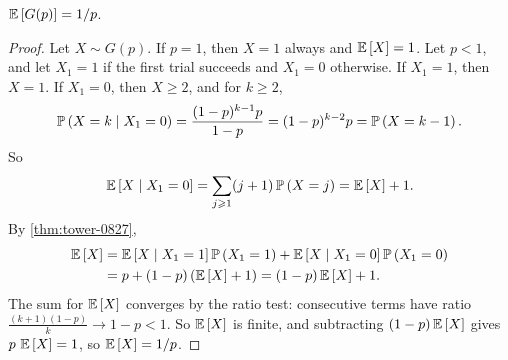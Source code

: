 \begin{theorem}\label{thm:geometric-0827}
    $\expectation{G(p)} = \sfrac{1}{p}$.
\end{theorem}

\begin{proof}
    Let $X \sim G(p)$. If $p = 1$, then $X = 1$ always and $\expectation{X} = 1$. Let $p < 1$, and
    let $X_1 = 1$ if the first trial succeeds and $X_1 = 0$ otherwise. If $X_1 = 1$, then $X = 1$.
    If $X_1 = 0$, then $X \geq 2$, and for $k \geq 2$,
    \[\prob{X = k \given X_1 = 0} = \frac{(1-p)^{k-1} p}{1 - p} = (1-p)^{k-2} p = \prob{X = k - 1}.\]
    So
    \[\expectation{X \given X_1 = 0} = \sum_{j \geq 1} (j + 1) \prob{X = j} = \expectation{X} + 1.\]
    By \cref{thm:tower-0827},
    \begin{align*}
        \expectation{X}
         & = \expectation{X \given X_1 = 1} \prob{X_1 = 1} + \expectation{X \given X_1 = 0} \prob{X_1 = 0} \\
         & = p + (1 - p)\left(\expectation{X} + 1\right)
        = (1 - p)\expectation{X} + 1.
    \end{align*}
    The sum for $\expectation{X}$ converges by the ratio test: consecutive terms have ratio
    $\frac{(k+1)(1-p)}{k} \to 1 - p < 1$. So $\expectation{X}$ is finite, and subtracting
    $(1 - p)\expectation{X}$ gives $p \, \expectation{X} = 1$, so $\expectation{X} = \sfrac{1}{p}$.
\end{proof}

